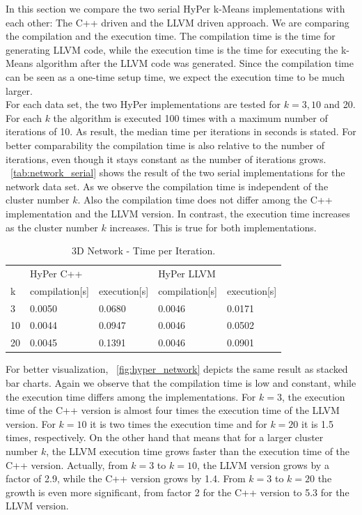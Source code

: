 In this section we compare the two serial HyPer k-Means implementations with each other: The C++ driven and the LLVM driven approach. We are comparing the compilation and the execution time. The compilation time is the time for generating LLVM code, while the execution time is the time for executing the k-Means algorithm after the LLVM code was generated. Since the compilation time can be seen as a one-time setup time, we expect the execution time to be much larger. 
\\
For each data set, the two HyPer implementations are tested for $k = 3,10$ and 20. For each $k$ the algorithm is executed 100 times with a maximum number of iterations of 10. As result, the median time per iterations in seconds is stated. For better comparability the compilation time is also relative to the number of iterations, even though it stays constant as the number of iterations grows.
\\
~\autoref{tab:network_serial} shows the result of the two serial implementations for the network data set. As we observe the compilation time is independent of the cluster number $k$. Also the compilation time does not differ among the C++ implementation and the LLVM version. In contrast, the execution time increases as the cluster number $k$ increases. This is true for both implementations. 

\begin{table}[htsb]
  \caption[3D Network - Time per Iteration]{3D Network - Time per Iteration.}\label{tab:network_serial}
  \centering
  \begin{tabular}{l l l l l}
    \toprule
      & HyPer C++ & & HyPer LLVM & \\
      k & compilation[s] & execution[s] & compilation[s] & execution[s] \\
    \midrule
      3 & 0.0050 & 0.0680 & 0.0046 & 0.0171 \\
      10 & 0.0044 & 0.0947 & 0.0046 & 0.0502 \\
      20 & 0.0045 & 0.1391 & 0.0046 & 0.0901 \\
    \bottomrule
  \end{tabular}
\end{table}


For better visualization, ~\autoref{fig:hyper_network} depicts the same result as stacked bar charts. Again we observe that the compilation time is low and constant, while the execution time differs among the implementations. For $k = 3$, the execution time of the C++ version is almost four times the execution time of the LLVM version. For $k = 10$ it is two times the execution time and for $k = 20$ it is 1.5 times, respectively. On the other hand that means that for a larger cluster number $k$, the LLVM execution time grows  faster than the execution time of the C++ version. Actually, from $k = 3$ to $k = 10$, the LLVM version grows by a factor of 2.9, while the C++ version grows by 1.4. From $k = 3$ to $k = 20$ the growth is even more significant, from factor 2 for the C++ version to 5.3 for the LLVM version.


